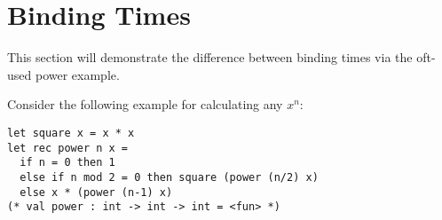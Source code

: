 \documentclass[12pt, titlepage]{article}
\newcounter{mnum}
\newcommand{\mthemnum}{M\themnum}
\begin{document}
%
%
%
%
%
%
%
%

\section{Binding Times}

This section will demonstrate the difference between binding times via the 
oft-used power example.

Consider the following example for calculating any $x^n$:
\begin{lstlisting}
let square x = x * x
let rec power n x =
  if n = 0 then 1
  else if n mod 2 = 0 then square (power (n/2) x)
  else x * (power (n-1) x)
(* val power : int -> int -> int = <fun> *)
\end{lstlisting}
\end{document}
